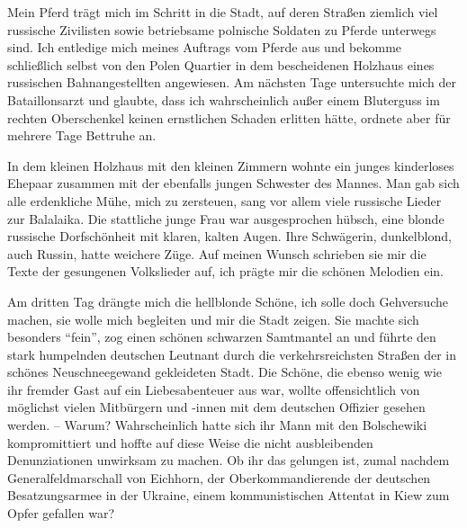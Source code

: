 Mein Pferd trägt mich im Schritt in die Stadt, auf deren Straßen ziemlich viel russische Zivilisten sowie betriebsame polnische Soldaten zu Pferde unterwegs sind. Ich entledige mich meines Auftrags vom Pferde aus und bekomme schließlich selbst von den Polen Quartier in dem bescheidenen Holzhaus eines russischen Bahnangestellten angewiesen. Am nächsten Tage untersuchte mich der Bataillonsarzt und glaubte, dass ich wahrscheinlich außer einem Bluterguss im rechten Oberschenkel keinen ernstlichen Schaden erlitten hätte, ordnete aber für mehrere Tage Bettruhe an.

In dem kleinen Holzhaus mit den kleinen Zimmern wohnte ein junges kinderloses Ehepaar zusammen mit der ebenfalls jungen Schwester des Mannes. Man gab sich alle erdenkliche Mühe, mich zu zersteuen, sang vor allem viele russische Lieder zur Balalaika. Die stattliche junge Frau war ausgesprochen hübsch, eine blonde russische Dorfschönheit mit klaren, kalten Augen. Ihre Schwägerin, dunkelblond, auch Russin, hatte weichere Züge. Auf meinen Wunsch schrieben sie mir die Texte der gesungenen Volkslieder auf, ich prägte mir die schönen Melodien ein.

Am dritten Tag drängte mich die hellblonde Schöne, ich solle doch Gehversuche machen, sie wolle mich begleiten und mir die Stadt zeigen. Sie machte sich besonders \enquote{fein}, zog einen schönen schwarzen Samtmantel an und führte den stark humpelnden deutschen Leutnant durch die verkehrsreichsten Straßen der in schönes Neuschneegewand gekleideten Stadt. Die Schöne, die ebenso wenig wie ihr fremder Gast auf ein Liebesabenteuer aus war, wollte offensichtlich von möglichst vielen Mitbürgern und -innen mit dem deutschen Offizier gesehen werden. -- Warum? Wahrscheinlich hatte sich ihr Mann mit den Bolschewiki kompromittiert und hoffte auf diese Weise die nicht ausbleibenden Denunziationen unwirksam zu machen. Ob ihr das gelungen ist, zumal nachdem Generalfeldmarschall von Eichhorn, der Oberkommandierende der deutschen Besatzungsarmee in der Ukraine, einem kommunistischen Attentat in Kiew zum Opfer gefallen war?

